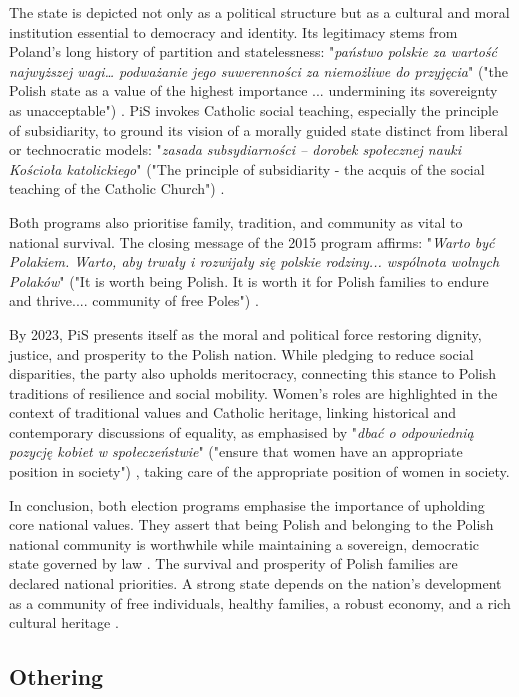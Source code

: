 The state is depicted not only as a political structure but as a cultural and moral institution essential to democracy and identity. Its legitimacy stems from Poland’s long history of partition and statelessness: "\textit{państwo polskie za wartość najwyższej wagi… podważanie jego suwerenności za niemożliwe do przyjęcia}" ("the Polish state as a value of the highest importance ... undermining its sovereignty as unacceptable") \citep{pis_program_2014}. PiS invokes Catholic social teaching, especially the principle of subsidiarity, to ground its vision of a morally guided state distinct from liberal or technocratic models: "\textit{zasada subsydiarności – dorobek społecznej nauki Kościoła katolickiego}" ("The principle of subsidiarity - the acquis of the social teaching of the Catholic Church") \citep{pis_program_2023}.

Both programs also prioritise family, tradition, and community as vital to national survival. The closing message of the 2015 program affirms: "\textit{Warto być Polakiem. Warto, aby trwały i rozwijały się polskie rodziny... wspólnota wolnych Polaków}" ("It is worth being Polish. It is worth it for Polish families to endure and thrive.... community of free Poles") \citep{pis_program_2014}.

By 2023, PiS presents itself as the moral and political force restoring dignity, justice, and prosperity to the Polish nation. While pledging to reduce social disparities, the party also upholds meritocracy, connecting this stance to Polish traditions of resilience and social mobility. Women's roles are highlighted in the context of traditional values and Catholic heritage, linking historical and contemporary discussions of equality, as emphasised by "\textit{dbać o odpowiednią pozycję kobiet w społeczeństwie}" ("ensure that women have an appropriate position in society") \citep{pis_program_2023}, taking care of the appropriate position of women in society.

In conclusion, both election programs emphasise the importance of upholding core national values. They assert that being Polish and belonging to the Polish national community is worthwhile while maintaining a sovereign, democratic state governed by law \citep{pis_program_2014}. The survival and prosperity of Polish families are declared national priorities. A strong state depends on the nation's development as a community of free individuals, healthy families, a robust economy, and a rich cultural heritage \citep{pis_program_2023}.


\subsection{Othering}

